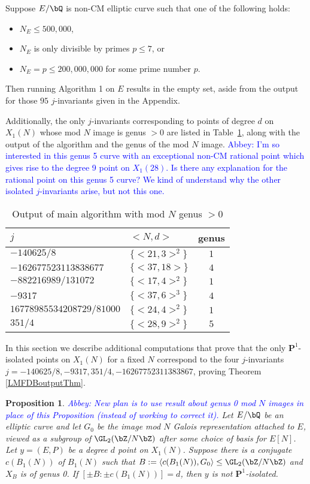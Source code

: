 \documentclass[11pt,reqno]{amsart}
\theoremstyle{plain}
\newtheorem{proposition}[theorem]{Proposition}
\theoremstyle{definition}
\newcommand{\Q}{\bQ}
\newcommand{\Z}{\bZ}
\newcommand{\PP}{\mathbf P}
\newcommand{\abbey}[1]{\textcolor{blue}{Abbey: #1}}
\newcommand{\abedit}[1]{{\color{blue} #1}}
\begin{document}
\abedit{Suppose $E/\Q$ is non-CM elliptic curve such that one of the following holds:
\begin{itemize}
    \item$N_E \leq 500{,}000$,
    \item $N_E$ is only divisible by primes $p \leq 7$, or
    \item $N_E=p \leq 200{,}000{,}000$ for some prime number $p$.
\end{itemize} Then running Algorithm 1 on $E$ results in the empty set, aside from the output for those $95$ $j$-invariants given in the Appendix.}
Additionally, the only $j$-invariants corresponding to points of degree $d$ on $X_1(N)$ whose mod $N$ image is genus $>0$ are listed in Table~\ref{table:imagegt0}, along with the output of the algorithm and the genus of the mod $N$ image. \abbey{I'm so interested in this genus 5 curve with an exceptional non-CM rational point which gives rise to the degree 9 point on $X_1(28)$. Is there any explanation for the rational point on this genus 5 curve? We kind of understand why the other isolated $j$-invariants arise, but not this one.}
	\begin{table}[h]
	\begin{center}
		\begin{tabularx}{242pt}{l l c} \toprule
		$j$ & $<N, d>$ & genus  \\\midrule
$-140625/8$ &  $\{ <21, 3>^2 \} $ & $1$\\
 $-162677523113838677$& $\{ <37, 18> \}$ & $4$\\
 $-882216989/131072$ & $\{ <17, 4>^2\}$ & $1$ \\
 $-9317$ & $\{ <37, 6>^3 \} $ & $4$\\
 $16778985534208729/81000$ & $\{ <24, 4>^2 \}$ & $1$\\
 $351/4$ & $\{ <28, 9>^2 \}$ & $5$\\ \bottomrule
		\end{tabularx}
		\caption{Output of main algorithm with mod $N$ genus $>0$}\label{table:imagegt0}
	\end{center}
\end{table}

In this section we describe additional computations that prove that the only $\PP^1$-isolated points on $X_1(N)$ for a fixed $N$ correspond to the four $j$-invariants $j=-140625/8,-9317,351/4, -16267752311383867$, proving Theorem \ref{LMFDBoutputThm}.
\begin{proposition} \abbey{New plan is to use result about genus 0 mod $N$ images in place of this Proposition (instead of working to correct it).}
    Let $E/\Q$ be an elliptic curve and let $G_0$ be the image mod $N$ Galois representation attached to $E$, viewed as a subgroup of $\GL_2(\Z/N\Z)$ after some choice of basis for $E[N]$. Let $y=(E,P)$ be a degree $d$ point on $X_1(N)$. Suppose there is a conjugate $c(B_1(N))$ of $B_1(N)$ such that $B:=\langle c(B_1(N)), G_0 \rangle \leq \GL_2(\Z/N\Z)$ and $X_B$ is of genus 0. If $[\pm B: \pm c(B_1(N))]=d$, then $y$ is not $\PP^1$-isolated.
\end{proposition}
\end{document}

